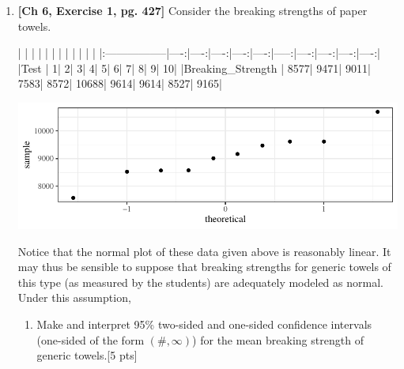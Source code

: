 \documentclass[11pt]{article}\usepackage[]{graphicx}\usepackage[]{color}
\begin{document}
{\begin{enumerate}
    
 \item \textbf{[Ch 6, Exercise 1, pg. 427]} Consider the breaking strengths of paper towels.
 
\begin{Schunk}
\begin{Soutput}
|                  |     |     |     |     |     |      |     |     |     |     |
|:-----------------|----:|----:|----:|----:|----:|-----:|----:|----:|----:|----:|
|Test              |    1|    2|    3|    4|    5|     6|    7|    8|    9|   10|
|Breaking_Strength | 8577| 9471| 9011| 7583| 8572| 10688| 9614| 9614| 8527| 9165|
\end{Soutput}
\end{Schunk}
\includegraphics{stat305_hw8-003}

    Notice that the normal plot of these data given above is reasonably linear. It may thus be sensible to suppose that breaking strengths for generic towels of this type (as measured by the students) are adequately modeled as normal. Under this assumption,
          \begin{enumerate}
            \item Make and interpret 95\% two-sided and one-sided confidence intervals (one-sided of the form $(\#, \infty)$) for the mean breaking strength of generic towels.[5 pts]
    


\end{enumerate}
\end{enumerate}}
\end{document}

